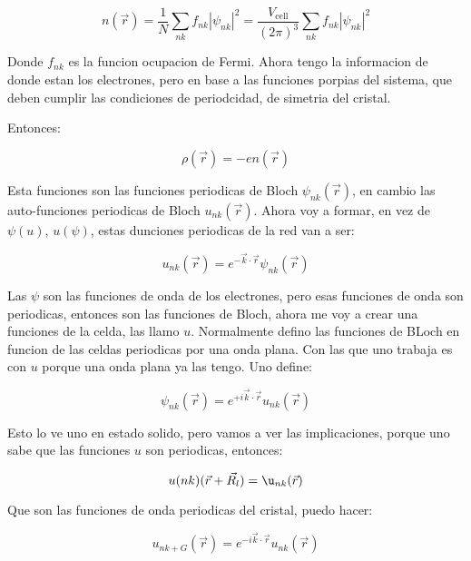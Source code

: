 \documentclass[11pt,fleqn]{book}
\begin{document}
\begin{equation}
    n(\vec{r})=\frac{1}{N}\sum_{nk}f_{nk}|\psi_{nk}|^{2}=\frac{V_{\text{cell}}}{(2\pi)^{3}}\sum_{nk}f_{nk}|\psi_{nk}|^{2}
\end{equation}  

Donde $f_{nk}$ es la funcion ocupacion de Fermi. Ahora tengo la informacion de donde estan los electrones, pero en base a las funciones porpias del sistema, que deben cumplir las condiciones de periodcidad, de simetria del cristal.

Entonces:

\begin{equation}
    \rho(\vec{r})=-en(\vec{r})
\end{equation}

Esta funciones son las funciones periodicas de Bloch $\psi_{nk}(\vec{r})$, en cambio las auto-funciones periodicas de Bloch $u_{nk}(\vec{r})$. Ahora voy a formar, en vez de $\psi(u)$, $u(\psi)$, estas dunciones periodicas de la red van a ser:

\begin{equation}
    u_{nk}(\vec{r})=e^{-\vec{k}\cdot\vec{r}}\psi_{nk}(\vec{r})
\end{equation}

Las $\psi$ son las funciones de onda de los electrones, pero esas funciones de onda son periodicas, entonces son las funciones de Bloch, ahora me voy a crear una funciones de la celda, las llamo $u$. Normalmente defino las funciones de BLoch en funcion de las celdas periodicas por una onda plana. Con las que uno trabaja es con $u$ porque una onda plana ya las tengo. Uno define:

\begin{equation}
    \psi_{nk}(\vec{r})=e^{+i\vec{k}\cdot\vec{r}}u_{nk}(\vec{r})
\end{equation}

Esto lo ve uno en estado solido, pero vamos a ver las implicaciones, porque uno sabe que las funciones $u$ son periodicas, entonces:

\begin{equation}
    u(nk)(\vec{r}+\vec{R_{l}})=\u_{nk}(\vec{r})
\end{equation}

Que son las funciones de onda periodicas del cristal, puedo hacer:

\begin{equation}
    u_{nk+G}(\vec{r})=e^{-i\vec{k}\cdot\vec{r}}u_{nk}(\vec{r})
\end{equation}
\end{document}
